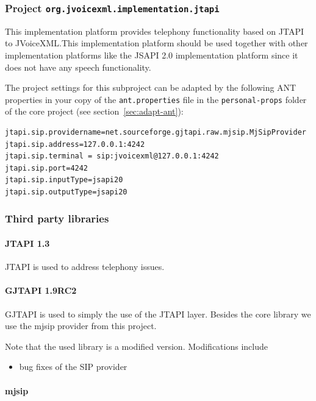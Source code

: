 \documentclass[11pt,a4paper]{article}
\begin{document}
\subsubsection{Project \texttt{org.jvoicexml.implementation.jtapi}}

This implementation platform provides telephony functionality based on JTAPI to
JVoiceXML.This implementation platform should be used together with other
implementation platforms like the JSAPI 2.0 implementation platform since it
does not have any speech functionality.

The project settings for this subproject can be adapted by the following ANT
properties in your copy of the \texttt{ant.properties} file in the
\texttt{personal-props} folder of the core project (see 
section~\ref{sec:adapt-ant}):
\begin{lstlisting}
jtapi.sip.providername=net.sourceforge.gjtapi.raw.mjsip.MjSipProvider
jtapi.sip.address=127.0.0.1:4242
jtapi.sip.terminal = sip:jvoicexml@127.0.0.1:4242
jtapi.sip.port=4242
jtapi.sip.inputType=jsapi20
jtapi.sip.outputType=jsapi20
\end{lstlisting}

\subsubsection{Third party libraries}
\label{sec:jtapi-third-party-libr}

\paragraph{JTAPI 1.3}

JTAPI is used to address telephony issues.

\paragraph{GJTAPI 1.9RC2}

GJTAPI is used to simply the use of the JTAPI layer. Besides the core library
we use the mjsip provider from this project.

Note that the used library is a modified version. Modifications include
\begin{itemize}
\item bug fixes of the SIP provider
\end{itemize}

\paragraph{mjsip}
\end{document}
